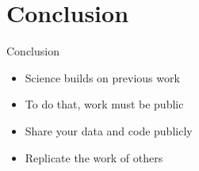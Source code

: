 \documentclass{beamer}
\begin{document}
\section{Conclusion}
\begin{frame}{Conclusion}
\begin{itemize}
\item Science builds on previous work
\item To do that, work must be public
\item Share your data and code publicly
\item Replicate the work of others
\end{itemize}
\end{frame}
\end{document}
